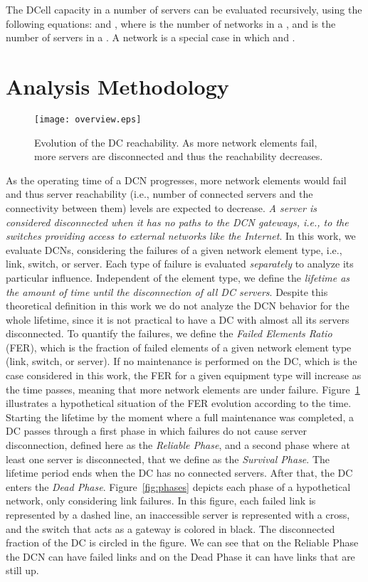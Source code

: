 The DCell capacity in a number of servers can be evaluated recursively, using the following equations:  and , where  is the number of  networks in a , and  is the number of servers in a .
A  network is a special case in which  and .

\section{Analysis Methodology}
\label{sec:methodology}
\begin{figure}
\centering
\texttt{[image: overview.eps]}
\caption{Evolution of the DC reachability. As more network elements fail, more servers are disconnected and thus the reachability decreases. }
\label{fig:overview}
\end{figure}
As the operating time of a DCN progresses, more network elements would fail and thus server reachability (i.e., number of connected servers and the connectivity between them) levels are expected to decrease. \textit{A server is considered disconnected when it has no paths to the DCN gateways, i.e., to the switches providing access to external networks like the Internet}. In this work, we evaluate DCNs, considering the failures of a given network element type, i.e., link, switch, or server. Each type of failure is evaluated \textit{separately} to analyze its particular influence. Independent of the element type, we define the \textit{lifetime as the amount of time until the disconnection of all DC servers}. 
Despite this theoretical definition in this work we do not analyze the DCN behavior for the whole lifetime, since it is not practical to have a DC with almost all its servers disconnected.
To quantify the failures, we define the \textit{Failed Elements Ratio} (FER), which is the fraction of failed elements of a given network element type (link, switch, or server). If no maintenance is performed on the DC, which is the case considered in this work, the FER for a given 
equipment type 
will increase as the time passes, meaning that more 
network elements are under failure. Figure~\ref{fig:overview} illustrates a hypothetical situation of the FER evolution according to the time. Starting the lifetime by the moment where a full maintenance was completed, a DC passes through a first phase in which failures do not cause server disconnection, defined here as the \textit{Reliable Phase}, and a second phase where at least one server is disconnected, that we define as the \textit{Survival Phase}. The lifetime period ends 
when the DC has no connected servers. After that, the DC enters the \textit{Dead Phase}. Figure~\ref{fig:phases} depicts each phase of a hypothetical network, only considering link failures. In this figure, each failed link is represented by a dashed line, an inaccessible server is represented with a cross, and the switch that acts as a gateway is colored in black. The disconnected fraction of the DC is circled in the figure. We can see that on the Reliable Phase the DCN can have failed links and on the Dead Phase it can have links that are still up.
